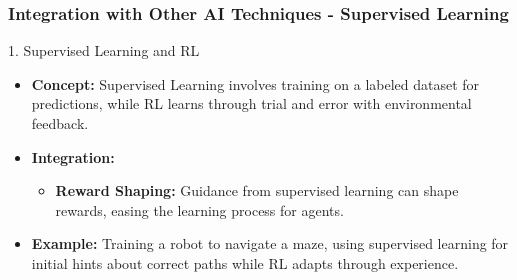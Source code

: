 \documentclass{beamer}
\begin{document}
\begin{frame}[fragile]
    \frametitle{Integration with Other AI Techniques - Supervised Learning}
    \begin{block}{1. Supervised Learning and RL}
        \begin{itemize}
            \item \textbf{Concept:} 
                Supervised Learning involves training on a labeled dataset for predictions, while RL learns through trial and error with environmental feedback.
                
            \item \textbf{Integration:} 
                \begin{itemize}
                    \item \textbf{Reward Shaping:} Guidance from supervised learning can shape rewards, easing the learning process for agents.
                \end{itemize}  

            \item \textbf{Example:} 
                Training a robot to navigate a maze, using supervised learning for initial hints about correct paths while RL adapts through experience.
        \end{itemize}
    \end{block}
\end{frame}
\end{document}
